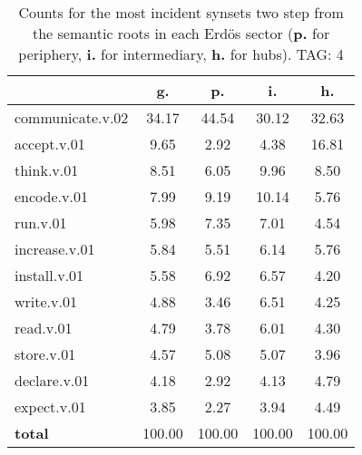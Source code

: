 \begin{table}[h!]
\begin{center}
\begin{tabular}{| l | c | c | c | c |}\hline
 & g. & p. & i. & h. \\\hline
communicate.v.02 & 34.17  & 44.54  & 30.12  & 32.63 \\\hline
accept.v.01 & 9.65  & 2.92  & 4.38  & 16.81 \\\hline
think.v.01 & 8.51  & 6.05  & 9.96  & 8.50 \\\hline
encode.v.01 & 7.99  & 9.19  & 10.14  & 5.76 \\\hline
run.v.01 & 5.98  & 7.35  & 7.01  & 4.54 \\\hline
increase.v.01 & 5.84  & 5.51  & 6.14  & 5.76 \\\hline
install.v.01 & 5.58  & 6.92  & 6.57  & 4.20 \\\hline
write.v.01 & 4.88  & 3.46  & 6.51  & 4.25 \\\hline
read.v.01 & 4.79  & 3.78  & 6.01  & 4.30 \\\hline
store.v.01 & 4.57  & 5.08  & 5.07  & 3.96 \\\hline
declare.v.01 & 4.18  & 2.92  & 4.13  & 4.79 \\\hline
expect.v.01 & 3.85  & 2.27  & 3.94  & 4.49 \\\hline
{{\bf total}} & 100.00  & 100.00  & 100.00  & 100.00 \\\hline
\end{tabular}
\caption{Counts for the most incident synsets two step from the semantic roots in each Erd\"os sector ({\bf p.} for periphery, {\bf i.} for intermediary, {\bf h.} for hubs). TAG: 4}
\end{center}
\end{table}